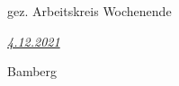 \documentclass[a5paper,ngerman]{scrartcl}
\date{\today}
\begin{document}

\begin{minipage}[t]{0.47\textwidth}
\underline{\hspace{7em}}

{\small gez. Arbeitskreis Wochenende}
\end{minipage}
\begin{minipage}[t]{0.47\textwidth}
\hfill
\underline{\normalsize\hspace{4em}\emph{4.12.2021}\hspace{0.1em}}

\hfill{\small Bamberg}
\end{minipage}
\end{document}
